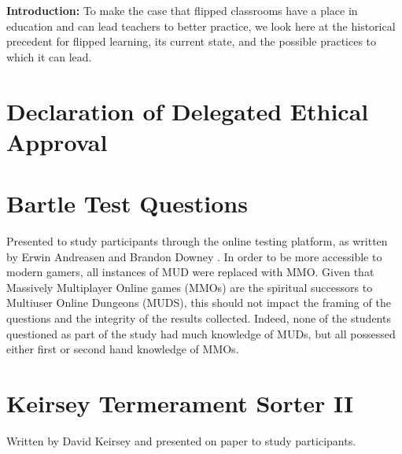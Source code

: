 \documentclass[12pt,a4paper,twoside]{report}
\begin{document}
\noindent \textbf{Introduction:} To make the case that flipped classrooms have a place in education and can lead teachers to better practice, we look here at the historical precedent for flipped learning, its current state, and the possible practices to which it can lead.

\begin{appendices}
	
\chapter{Declaration of Delegated Ethical Approval}
\label{sec:bsrec}

	
\chapter{Bartle Test Questions}
\label{sec:bartle}
Presented to study participants through the online testing platform, as written by Erwin Andreasen and Brandon Downey \cite{bartle-questions}. In order to be more accessible to modern gamers, all instances of MUD were replaced with MMO. Given that Massively Multiplayer Online games (MMOs) are the spiritual successors to Multiuser Online Dungeons (MUDS), this should not impact the framing of the questions and the integrity of the results collected. Indeed, none of the students questioned as part of the study had much knowledge of MUDs, but all possessed either first or second hand knowledge of MMOs.
\clearpage
\linespread{1.0}

\linespread{1.3}

\chapter{Keirsey Termerament Sorter II}
\label{sec:keirsey}
Written by David Keirsey \cite{keirsey1998please} and presented on paper to study participants.

\end{appendices}



\end{document}
